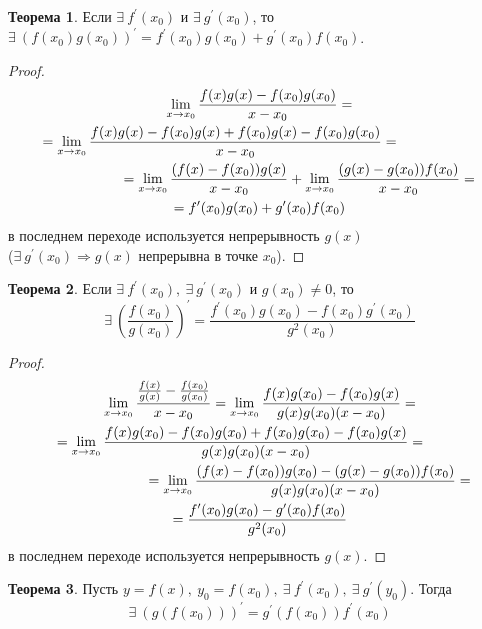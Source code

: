 \documentclass[a4paper, 12pt]{article}
\newcommand\tab[1][.5cm]{\hspace*{#1}}
\theoremstyle{definition}
\newtheorem*{theorem}{Теорема}
\begin{document}
        \begin{theorem}
            Если $\exists\ f^{\prime}(x_0)$ и $\exists\ g^{\prime}(x_0)$, то $\exists\ (f(x_0)g(x_0))^{\prime}=f^{\prime}(x_0)g(x_0)+g^{\prime}(x_0)f(x_0)$.
        \end{theorem} 
        \begin{proof}
            \begin{multline*}
                \lim\limits_{x\to x_0}\frac{f(x)g(x)-f(x_0)g(x_0)}{x-x_0}=\\
                =\lim\limits_{x\to x_0}\frac{f(x)g(x)-f(x_0)g(x)+f(x_0)g(x)-f(x_0)g(x_0)}{x-x_0}=\tab[2cm]\\
                \tab[2cm]=\lim\limits_{x\to x_0}\frac{(f(x)-f(x_0))g(x)}{x-x_0}+\lim\limits_{x\to x_0}\frac{(g(x)-g(x_0))f(x_0)}{x-x_0}=\\
                =f^{\prime}(x_0)g(x_0)+g^{\prime}(x_0)f(x_0)
            \end{multline*}
            в последнем переходе используется непрерывность $g(x)$\\
            ($\exists\ g^{\prime}(x_0) \Rightarrow g(x)$ непрерывна в точке $x_0$).
        \end{proof} 
        \begin{theorem}
            Если $\exists\ f^{\prime}(x_0),\ \exists\ g^{\prime}(x_0)$ и $g(x_0)\ne 0$, то
            \[\exists\ (\frac{f(x_0)}{g(x_0)})^{\prime}=\frac{f^{\prime}(x_0)g(x_0)-f(x_0)g^{\prime}(x_0)}{g^2(x_0)}\]
        \end{theorem} 
        \begin{proof}
            \begin{multline*}
                \lim\limits_{x\to x_0}\frac{\frac{f(x)}{g(x)}-\frac{f(x_0)}{g(x_0)}}{x-x_0}=\lim\limits_{x\to x_0}\frac{f(x)g(x_0)-f(x_0)g(x)}{g(x)g(x_0)(x-x_0)}=\\
                =\lim\limits_{x\to x_0}\frac{f(x)g(x_0)-f(x_0)g(x_0)+f(x_0)g(x_0)-f(x_0)g(x)}{g(x)g(x_0)(x-x_0)}=\tab[1cm]\\
                \tab[2.5cm]=\lim\limits_{x\to x_0}\frac{(f(x)-f(x_0))g(x_0)-(g(x)-g(x_0))f(x_0)}{g(x)g(x_0)(x-x_0)}=\\
                =\frac{f^{\prime}(x_0)g(x_0)-g^{\prime}(x_0)f(x_0)}{g^2(x_0)}
            \end{multline*}
            в последнем переходе используется непрерывность $g(x)$.
        \end{proof} 
        \begin{theorem}
            Пусть $y=f(x),\ y_0=f(x_0),\ \exists\ f^{\prime}(x_0),\ \exists\ g^{\prime}(y_0)$. Тогда
            \[\exists\ (g(f(x_0)))^{\prime}=g^{\prime}(f(x_0))f^{\prime}(x_0)\]
        \end{theorem}
\end{document}
